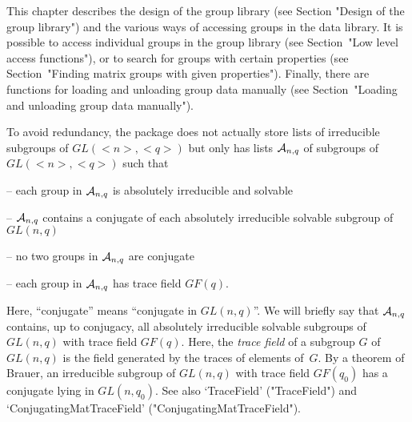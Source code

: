 


This chapter describes the design of the {\IRREDSOL} group library (see 
Section "Design of the group library") and the
 various ways of accessing groups in the data library.
It is possible to access individual groups in the group library (see
Section~"Low level access functions"), or to search for groups with certain
properties (see Section~"Finding matrix groups with given properties"). 
Finally, there are functions for loading and unloading group data 
manually (see Section~"Loading and unloading group data manually").



To avoid redundancy, the package {\IRREDSOL} does not actually store 
lists of irreducible subgroups of $GL(<n>, <q>)$ but
only has lists ${\cal
A}_{n,q}$ of subgroups of $GL(<n>, <q>)$ such that

\beginlist
\item{--} each group in ${\cal A}_{n,q}$ is absolutely irreducible and
solvable

\item{--} ${\cal A}_{n,q}$ contains a conjugate of each absolutely
irreducible solvable subgroup of $GL(n, q)$

\item{--} no two groups in ${\cal A}_{n,q}$ are conjugate

\item{--} each group in ${\cal A}_{n,q}$ has trace field $GF(q)$.

\endlist Here, ``conjugate'' means ``conjugate in $GL(n,q)$''. We will
briefly say that ${\cal A}_{n,q}$ contains, up to conjugacy, all absolutely
irreducible solvable subgroups of $GL(n,q)$ with trace field $GF(q)$. 
Here, the {\it trace field} of a
subgroup $G$ of
$GL(n, q)$ is the field generated by the traces of elements of~$G$. By a 
theorem of Brauer, an irreducible subgroup of $GL(n, q)$ with trace field $GF(q_0)$ 
has a conjugate lying in $GL(n, q_0)$. See also `TraceField' ("TraceField")
and `ConjugatingMatTraceField' ("ConjugatingMatTraceField").

